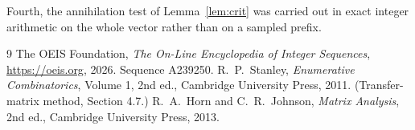\documentclass[11pt,a4paper]{article}
\theoremstyle{plain}
\theoremstyle{definition}
\begin{document}
Fourth, the annihilation test of Lemma~\ref{lem:crit} was carried out in exact integer
arithmetic on the whole vector rather than on a sampled prefix.

\begin{thebibliography}{9}
 The OEIS Foundation, \emph{The On-Line Encyclopedia of Integer
Sequences}, \url{https://oeis.org}, 2026. Sequence A239250.
 R.~P.~Stanley, \emph{Enumerative Combinatorics}, Volume 1, 2nd ed.,
Cambridge University Press, 2011. (Transfer-matrix method, Section 4.7.)
 R.~A.~Horn and C.~R.~Johnson, \emph{Matrix Analysis}, 2nd ed., Cambridge
University Press, 2013.
\end{thebibliography}
\end{document}
